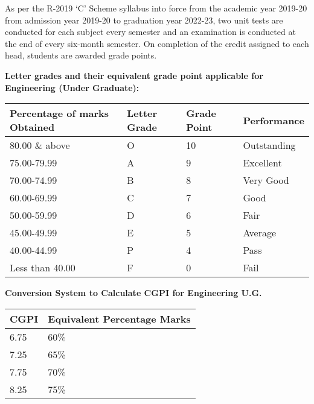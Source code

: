 \documentclass{article} %
\begin{document}
\noindent As per the R-2019 `C' Scheme syllabus into force from the academic year 2019-20 from admission year 2019-20 to graduation year 2022-23, two unit tests are conducted for each subject every semester and an examination is conducted at the end of every six-month semester. On completion of the credit assigned to each head, students are awarded grade points.

\noindent 

\noindent \textbf{Letter grades and their equivalent grade point applicable for Engineering (Under Graduate):}

\noindent \textbf{}

\begin{tabular}{|p{1.0in}|p{1.0in}|p{1.0in}|p{1.0in}|} \hline 
\textbf{Percentage of marks Obtained} & \textbf{Letter Grade} & \textbf{Grade Point} & \textbf{Performance} \\ \hline 
80.00 \& above & O & 10 & Outstanding \\ \hline 
75.00-79.99 & A & 9 & Excellent \\ \hline 
70.00-74.99 & B & 8 & Very Good \\ \hline 
60.00-69.99 & C & 7 & Good \\ \hline 
50.00-59.99 & D & 6 & Fair \\ \hline 
45.00-49.99 & E & 5 & Average \\ \hline 
40.00-44.99 & P & 4 & Pass \\ \hline 
Less than 40.00 & F & 0 & Fail \\ \hline 
\end{tabular}

\textbf{}

\noindent \textbf{}

\noindent \textbf{}

\noindent \textbf{}

\noindent \textbf{}

\noindent \textbf{}

\noindent \textbf{}

\noindent \textbf{Conversion System to Calculate CGPI for Engineering U.G.}

\noindent \textbf{}

\begin{tabular}{|p{2.6in}|p{1.5in}|} \hline 
\textbf{CGPI} & \textbf{Equivalent Percentage Marks} \\ \hline 
6.75 & 60\% \\ \hline 
7.25 & 65\% \\ \hline 
7.75\textbf{} & 70\% \\ \hline 
8.25 & 75\% \\ \hline 
\end{tabular}
\end{document}
